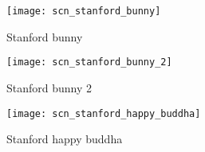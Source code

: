 \begin{figure} 
\centering 
\texttt{[image: scn\_stanford\_bunny]}
\caption{Stanford bunny}
\end{figure}

\begin{figure} 
\centering 
\texttt{[image: scn\_stanford\_bunny\_2]}
\caption{Stanford bunny 2}
\end{figure}

\begin{figure} 
\centering 
\texttt{[image: scn\_stanford\_happy\_buddha]}
\caption{Stanford happy buddha}
\end{figure}
